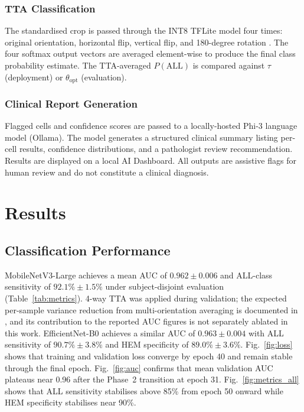 \documentclass[journal,twoside,web]{ieeecolor}
\begin{document}
\subsubsection{TTA Classification}
The standardised crop is passed through the INT8 TFLite model four times: original orientation, horizontal flip, vertical flip, and 180-degree rotation \cite{b_tta}. The four softmax output vectors are averaged element-wise to produce the final class probability estimate. The TTA-averaged $P(\mathrm{ALL})$ is compared against $\tau$ (deployment) or $\theta_{\mathrm{opt}}$ (evaluation).

\subsubsection{Clinical Report Generation}
Flagged cells and confidence scores are passed to a locally-hosted Phi-3 language model (Ollama). The model generates a structured clinical summary listing per-cell results, confidence distributions, and a pathologist review recommendation. Results are displayed on a local AI Dashboard. All outputs are assistive flags for human review and do not constitute a clinical diagnosis.

\section{Results}
\label{sec:results}

\subsection{Classification Performance}
MobileNetV3-Large achieves a mean AUC of $0.962 \pm 0.006$ and ALL-class sensitivity of $92.1\% \pm 1.5\%$ under subject-disjoint evaluation (Table~\ref{tab:metrics}). 4-way TTA was applied during validation; the expected per-sample variance reduction from multi-orientation averaging is documented in \cite{b_tta}, and its contribution to the reported AUC figures is not separately ablated in this work. EfficientNet-B0 achieves a similar AUC of $0.963 \pm 0.004$ with ALL sensitivity of $90.7\% \pm 3.8\%$ and HEM specificity of $89.0\% \pm 3.6\%$. Fig.~\ref{fig:loss} shows that training and validation loss converge by epoch 40 and remain stable through the final epoch. Fig.~\ref{fig:auc} confirms that mean validation AUC plateaus near 0.96 after the Phase~2 transition at epoch 31. Fig.~\ref{fig:metrics_all} shows that ALL sensitivity stabilises above 85\% from epoch 50 onward while HEM specificity stabilises near 90\%.
\end{document}
